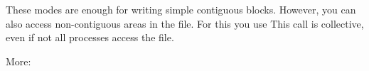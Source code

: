 These modes are enough for writing simple contiguous blocks. However,
you can also access non-contiguous areas in the file. For this you use
%
%
This call is collective, even if not all processes access the file.

More:


